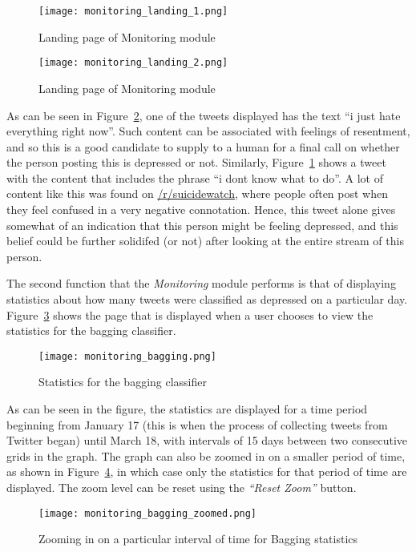 \begin{figure}
    \centering
    \texttt{[image: monitoring\_landing\_1.png]}
    \caption{Landing page of Monitoring module}
    \label{fig:monitoring_landing_1}
\end{figure}

\begin{figure}
    \centering
    \texttt{[image: monitoring\_landing\_2.png]}
    \caption{Landing page of Monitoring module}
    \label{fig:monitoring_landing_2}
\end{figure}

As can be seen in Figure~\ref{fig:monitoring_landing_2}, one of the tweets displayed has the text ``i just hate everything right now''. Such content can be associated with feelings of resentment, and so this is a good candidate to supply to a human for a final call on whether the person posting this is depressed or not. Similarly, Figure~\ref{fig:monitoring_landing_1} shows a tweet with the content that includes the phrase ``i dont know what to do''. A lot of content like this was found on \href{http://www.reddit.com/r/suicidewatch}{/r/suicidewatch}, where people often post when they feel confused in a very negative connotation. Hence, this tweet alone gives somewhat of an indication that this person might be feeling depressed, and this belief could be further solidifed (or not) after looking at the entire stream of this person.

The second function that the \emph{Monitoring} module performs is that of displaying statistics about how many tweets were classified as depressed on a particular day. Figure~\ref{fig:monitoring_bagging} shows the page that is displayed when a user chooses to view the statistics for the bagging classifier.

\begin{figure}
    \centering
    \texttt{[image: monitoring\_bagging.png]}
    \caption{Statistics for the bagging classifier}
    \label{fig:monitoring_bagging}
\end{figure}

As can be seen in the figure, the statistics are displayed for a time period beginning from January 17 (this is when the process of collecting tweets from Twitter began) until March 18, with intervals of 15 days between two consecutive grids in the graph. The graph can also be zoomed in on a smaller period of time, as shown in Figure~\ref{fig:monitoring_bagging_zoomed}, in which case only the statistics for that period of time are displayed. The zoom level can be reset using the \emph{``Reset Zoom''} button.

\begin{figure}
    \centering
    \texttt{[image: monitoring\_bagging\_zoomed.png]}
    \caption{Zooming in on a particular interval of time for Bagging statistics}
    \label{fig:monitoring_bagging_zoomed}
\end{figure}
